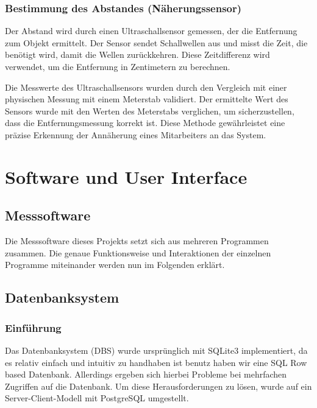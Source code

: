 \subsubsection{Bestimmung des Abstandes (Näherungssensor)}

Der Abstand wird durch einen Ultraschallsensor gemessen, der die Entfernung zum Objekt ermittelt. Der Sensor sendet Schallwellen aus und misst die Zeit, die benötigt wird, damit die Wellen zurückkehren. Diese Zeitdifferenz wird verwendet, um die Entfernung in Zentimetern zu berechnen.

\vspace{1em}
\noindent Die Messwerte des Ultraschallsensors wurden durch den Vergleich mit einer physischen Messung mit einem Meterstab validiert. Der ermittelte Wert des Sensors wurde mit den Werten des Meterstabs verglichen, um sicherzustellen, dass die Entfernungsmessung korrekt ist. Diese Methode gewährleistet eine präzise Erkennung der Annäherung eines Mitarbeiters an das System.


\section{Software und User Interface}
\label{sec:software_und_user_interface}



\subsection{Messsoftware}
\label{subsec:messsoftware}

Die Messsoftware dieses Projekts setzt sich aus mehreren Programmen zusammen.
Die genaue Funktionsweise und Interaktionen der einzelnen Programme miteinander werden nun im Folgenden erklärt.


\subsection{Datenbanksystem}
\label{subsec:datenbanksystem}


\subsubsection{Einführung}

Das Datenbanksystem (DBS) wurde ursprünglich mit SQLite3 implementiert, da es relativ einfach und intuitiv zu handhaben ist benutz haben wir eine SQL Row based Datenbank. Allerdings ergeben sich hierbei Probleme bei mehrfachen Zugriffen auf die Datenbank. Um diese Herausforderungen zu lösen, wurde auf ein Server-Client-Modell mit PostgreSQL umgestellt.


